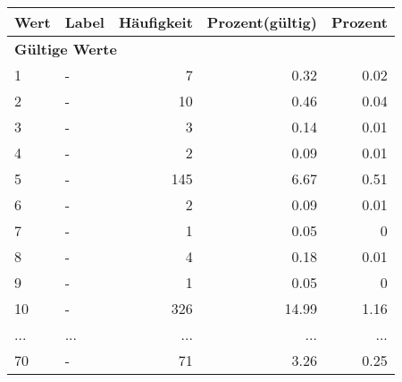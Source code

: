      \begin{longtable}{lXrrr}
     \toprule
     \textbf{Wert} & \textbf{Label} & \textbf{Häufigkeit} & \textbf{Prozent(gültig)} & \textbf{Prozent} \\
     \endhead
     \midrule
     \multicolumn{5}{l}{\textbf{Gültige Werte}}\\
        1 & \multicolumn{1}{X}{-} & %
          \num{7} &
          \num[round-mode=places,round-precision=2]{0.32} &
          \num[round-mode=places,round-precision=2]{0.02} \\
        2 & \multicolumn{1}{X}{-} & %
          \num{10} &
          \num[round-mode=places,round-precision=2]{0.46} &
          \num[round-mode=places,round-precision=2]{0.04} \\
        3 & \multicolumn{1}{X}{-} & %
          \num{3} &
          \num[round-mode=places,round-precision=2]{0.14} &
          \num[round-mode=places,round-precision=2]{0.01} \\
        4 & \multicolumn{1}{X}{-} & %
          \num{2} &
          \num[round-mode=places,round-precision=2]{0.09} &
          \num[round-mode=places,round-precision=2]{0.01} \\
        5 & \multicolumn{1}{X}{-} & %
          \num{145} &
          \num[round-mode=places,round-precision=2]{6.67} &
          \num[round-mode=places,round-precision=2]{0.51} \\
        6 & \multicolumn{1}{X}{-} & %
          \num{2} &
          \num[round-mode=places,round-precision=2]{0.09} &
          \num[round-mode=places,round-precision=2]{0.01} \\
        7 & \multicolumn{1}{X}{-} & %
          \num{1} &
          \num[round-mode=places,round-precision=2]{0.05} &
          \num[round-mode=places,round-precision=2]{0} \\
        8 & \multicolumn{1}{X}{-} & %
          \num{4} &
          \num[round-mode=places,round-precision=2]{0.18} &
          \num[round-mode=places,round-precision=2]{0.01} \\
        9 & \multicolumn{1}{X}{-} & %
          \num{1} &
          \num[round-mode=places,round-precision=2]{0.05} &
          \num[round-mode=places,round-precision=2]{0} \\
        10 & \multicolumn{1}{X}{-} & %
          \num{326} &
          \num[round-mode=places,round-precision=2]{14.99} &
          \num[round-mode=places,round-precision=2]{1.16} \\
       ... & ... & ... & ... & ... \\
        70 & \multicolumn{1}{X}{-} & %
          \num{71} &
          \num[round-mode=places,round-precision=2]{3.26} &
          \num[round-mode=places,round-precision=2]{0.25} \\


\end{longtable}
